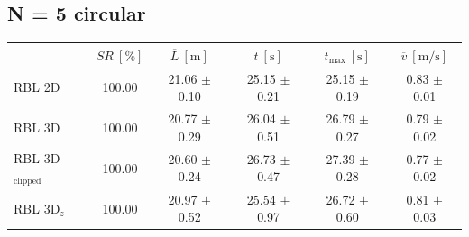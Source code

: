         \subsection{N = 5 circular}
            \begin{table}[H]
                \centering
                \renewcommand{\arraystretch}{1.2}
                \begin{tabular}{|l|c|c|c|c|c|}
                \hline
                                            & \( SR \ [\%] \) & \( \overline{L} \ [\mathrm{m}] \) & \( \overline{t} \ [\mathrm{s}] \) & \( \overline{t}_{\text{max}} \ [\mathrm{s}] \) & \( \overline{v} \ [\mathrm{m/s}] \)     \\ \hline
                RBL 2D                      & 100.00          & 21.06 $\pm$ 0.10                  & 25.15 $\pm$ 0.21                  & 25.15 $\pm$ 0.19                               & 0.83 $\pm$ 0.01                         \\ \hline
                RBL 3D                      & 100.00          & 20.77 $\pm$ 0.29                  & 26.04 $\pm$ 0.51                  & 26.79 $\pm$ 0.27                               & 0.79 $\pm$ 0.02                         \\ \hline
                RBL 3D\(_{\text{clipped}}\) & 100.00          & 20.60 $\pm$ 0.24                  & 26.73 $\pm$ 0.47                  & 27.39 $\pm$ 0.28                               & 0.77 $\pm$ 0.02                         \\ \hline
                RBL 3D\(_z\)                & 100.00          & 20.97 $\pm$ 0.52                  & 25.54 $\pm$ 0.97                  & 26.72 $\pm$ 0.60                               & 0.81 $\pm$ 0.03                         \\ \hline
                \end{tabular}
            \end{table}


